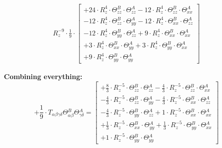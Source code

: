 \documentclass{article}
\begin{document}
\begin{subequations}
\begin{gather}
 R_{z}^{-9} \cdot \frac{1}{9} \cdot  \left[ \begin{array}{c} 
 		+ 24 \cdot R_{z}^{4} \cdot \Theta{}^{B}_{zz} \cdot \Theta{}^{A}_{zz}- 12 \cdot R_{z}^{4} \cdot \Theta{}^{B}_{zz} \cdot \Theta{}^{A}_{xx} 
 \\[0.2em] 		 - 12 \cdot R_{z}^{4} \cdot \Theta{}^{B}_{zz} \cdot \Theta{}^{A}_{yy}- 12 \cdot R_{z}^{4} \cdot \Theta{}^{B}_{xx} \cdot \Theta{}^{A}_{zz} 
 \\[0.2em] 		 - 12 \cdot R_{z}^{4} \cdot \Theta{}^{B}_{yy} \cdot \Theta{}^{A}_{zz}+ 9 \cdot R_{z}^{4} \cdot \Theta{}^{B}_{xx} \cdot \Theta{}^{A}_{xx} 
 \\[0.2em] 		 + 3 \cdot R_{z}^{4} \cdot \Theta{}^{B}_{xx} \cdot \Theta{}^{A}_{yy}+ 3 \cdot R_{z}^{4} \cdot \Theta{}^{B}_{yy} \cdot \Theta{}^{A}_{xx} 
 \\[0.2em] 		 + 9 \cdot R_{z}^{4} \cdot \Theta{}^{B}_{yy} \cdot \Theta{}^{A}_{yy}
 \end{array}\right] 
\end{gather}\end{subequations}


\textbf{Combining everything:}
\begin{equation}
+ \frac{1}{9} \cdot T_{\alpha{}\beta{}\gamma{}\delta{}} \Theta{}^{B}_{\alpha{}\beta{}} \Theta{}^{A}_{\gamma{}\delta{}} =  \left[ \begin{array}{c} 
 		+ \frac{8}{3} \cdot R_{z}^{-5} \cdot \Theta{}^{B}_{zz} \cdot \Theta{}^{A}_{zz}- \frac{4}{3} \cdot R_{z}^{-5} \cdot \Theta{}^{B}_{zz} \cdot \Theta{}^{A}_{xx} 
 \\[0.2em] 		 - \frac{4}{3} \cdot R_{z}^{-5} \cdot \Theta{}^{B}_{zz} \cdot \Theta{}^{A}_{yy}- \frac{4}{3} \cdot R_{z}^{-5} \cdot \Theta{}^{B}_{xx} \cdot \Theta{}^{A}_{zz} 
 \\[0.2em] 		 - \frac{4}{3} \cdot R_{z}^{-5} \cdot \Theta{}^{B}_{yy} \cdot \Theta{}^{A}_{zz}+ 1 \cdot R_{z}^{-5} \cdot \Theta{}^{B}_{xx} \cdot \Theta{}^{A}_{xx} 
 \\[0.2em] 		 + \frac{1}{3} \cdot R_{z}^{-5} \cdot \Theta{}^{B}_{xx} \cdot \Theta{}^{A}_{yy}+ \frac{1}{3} \cdot R_{z}^{-5} \cdot \Theta{}^{B}_{yy} \cdot \Theta{}^{A}_{xx} 
 \\[0.2em] 		 + 1 \cdot R_{z}^{-5} \cdot \Theta{}^{B}_{yy} \cdot \Theta{}^{A}_{yy}
 \end{array}\right] 
\end{equation}
\end{document}
